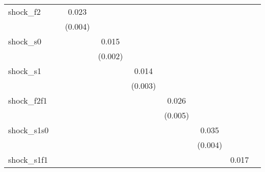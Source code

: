 {\begin{tabular}{l*{8}{c}}
\addlinespace
shock\_f2    &                     &       0.023\sym{***}&                     &                     &                     &                     &                     &                     \\
            &                     &     (0.004)         &                     &                     &                     &                     &                     &                     \\
\addlinespace
shock\_s0    &                     &                     &       0.015\sym{***}&                     &                     &                     &                     &                     \\
            &                     &                     &     (0.002)         &                     &                     &                     &                     &                     \\
\addlinespace
shock\_s1    &                     &                     &                     &       0.014\sym{***}&                     &                     &                     &                     \\
            &                     &                     &                     &     (0.003)         &                     &                     &                     &                     \\
\addlinespace
shock\_f2f1  &                     &                     &                     &                     &       0.026\sym{***}&                     &                     &                     \\
            &                     &                     &                     &                     &     (0.005)         &                     &                     &                     \\
\addlinespace
shock\_s1s0  &                     &                     &                     &                     &                     &       0.035\sym{***}&                     &                     \\
            &                     &                     &                     &                     &                     &     (0.004)         &                     &                     \\
\addlinespace
shock\_s1f1  &                     &                     &                     &                     &                     &                     &       0.017\sym{**} &                     \\

\end{tabular}}
